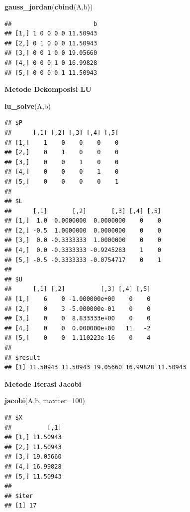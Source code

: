\documentclass[]{book}
\newenvironment{Shaded}{\begin{snugshade}}{\end{snugshade}}
\newcommand{\DataTypeTok}[1]{\textcolor[rgb]{0.13,0.29,0.53}{#1}}
\newcommand{\DecValTok}[1]{\textcolor[rgb]{0.00,0.00,0.81}{#1}}
\newcommand{\KeywordTok}[1]{\textcolor[rgb]{0.13,0.29,0.53}{\textbf{#1}}}
\newcommand{\NormalTok}[1]{#1}
\theoremstyle{definition}
\theoremstyle{definition}
\theoremstyle{definition}
\theoremstyle{remark}
\begin{document}
\begin{Shaded}
\begin{Highlighting}[]
\KeywordTok{gauss_jordan}\NormalTok{(}\KeywordTok{cbind}\NormalTok{(A,b))}
\end{Highlighting}
\end{Shaded}

\begin{verbatim}
##                       b
## [1,] 1 0 0 0 0 11.50943
## [2,] 0 1 0 0 0 11.50943
## [3,] 0 0 1 0 0 19.05660
## [4,] 0 0 0 1 0 16.99828
## [5,] 0 0 0 0 1 11.50943
\end{verbatim}

\textbf{Metode Dekomposisi LU}

\begin{Shaded}
\begin{Highlighting}[]
\KeywordTok{lu_solve}\NormalTok{(A,b)}
\end{Highlighting}
\end{Shaded}

\begin{verbatim}
## $P
##      [,1] [,2] [,3] [,4] [,5]
## [1,]    1    0    0    0    0
## [2,]    0    1    0    0    0
## [3,]    0    0    1    0    0
## [4,]    0    0    0    1    0
## [5,]    0    0    0    0    1
## 
## $L
##      [,1]       [,2]       [,3] [,4] [,5]
## [1,]  1.0  0.0000000  0.0000000    0    0
## [2,] -0.5  1.0000000  0.0000000    0    0
## [3,]  0.0 -0.3333333  1.0000000    0    0
## [4,]  0.0 -0.3333333 -0.9245283    1    0
## [5,] -0.5 -0.3333333 -0.0754717    0    1
## 
## $U
##      [,1] [,2]          [,3] [,4] [,5]
## [1,]    6    0 -1.000000e+00    0    0
## [2,]    0    3 -5.000000e-01    0    0
## [3,]    0    0  8.833333e+00    0    0
## [4,]    0    0  0.000000e+00   11   -2
## [5,]    0    0  1.110223e-16    0    4
## 
## $result
## [1] 11.50943 11.50943 19.05660 16.99828 11.50943
\end{verbatim}

\textbf{Metode Iterasi Jacobi}

\begin{Shaded}
\begin{Highlighting}[]
\KeywordTok{jacobi}\NormalTok{(A,b, }\DataTypeTok{maxiter=}\DecValTok{100}\NormalTok{)}
\end{Highlighting}
\end{Shaded}

\begin{verbatim}
## $X
##          [,1]
## [1,] 11.50943
## [2,] 11.50943
## [3,] 19.05660
## [4,] 16.99828
## [5,] 11.50943
## 
## $iter
## [1] 17
\end{verbatim}
\end{document}
